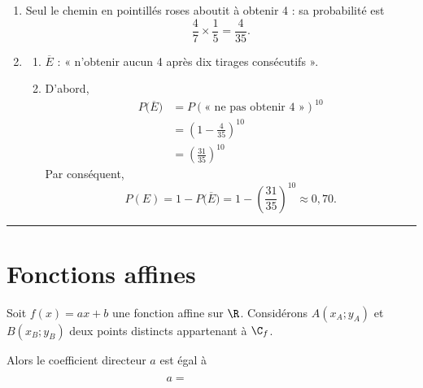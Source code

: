 {\begin{enumerate}
\begin{center}
		\end{center}
		\item 
		Seul le chemin en pointillés roses aboutit à obtenir 4 : sa probabilité est
			\[ \frac47 \times \frac15 = \frac4{35}. \]
		\item
			\begin{enumerate}
				\item 
				$\overline{E}$ : « n'obtenir aucun 4 après dix tirages consécutifs ».
				\item 
				D'abord, 
					\begin{align*}
					P\bigl(\overline{E}\bigr) &= P(\text{« ne pas obtenir 4 »})^{10} \\
						&= \left(1 - \frac4{35}\right)^{10} \\
						&= \left(\frac{31}{35}\right)^{10}
					\end{align*}
				Par conséquent, 
					\[ P(E) = 1 - P\bigl(\overline{E}\bigr) = 1 - \left(\frac{31}{35}\right)^{10} \approx 0,70. \]
			\end{enumerate}
	\end{enumerate}
}

\vspace{10pt}

\hrule

\vspace{10pt}

\newpage

\section*{Fonctions affines}


\begin{thm}\label{thm:1}
	Soit $f(x) = ax + b$ une fonction affine sur $\R$.
	Considérons $A(x_A ; y_A)$ et $B(x_B ; y_B)$ deux points distincts appartenant à $\C_f$.
	
	Alors le coefficient directeur $a$ est égal à
		\[ a = \phantom{\frac{y_B-y_A}{x_B - x_A} \hspace{1cm}} \]
\end{thm}

